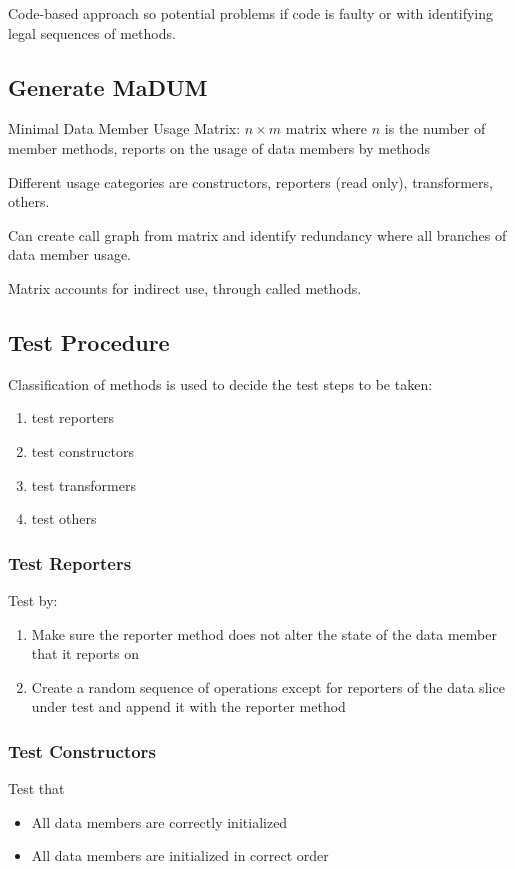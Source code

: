 \documentclass[11pt]{article}
\begin{document}
Code-based approach so potential problems if code is faulty
or with identifying legal sequences of methods.
\subsection{Generate MaDUM}
\label{sec:orgcc06cb6}
Minimal Data Member Usage Matrix: \(n \times m\) matrix where \(n\) is
the number of member methods, reports on the usage of data
members by methods

Different usage categories are constructors, reporters (read only),
transformers, others.

Can create call graph from matrix and identify redundancy where all
branches of data member usage.

Matrix accounts for indirect use, through called methods.
\subsection{Test Procedure}
\label{sec:orgda9ab09}
Classification of methods is used to decide the test steps to
be taken:
\begin{enumerate}
\item test reporters
\item test constructors
\item test transformers
\item test others
\end{enumerate}
\subsubsection{Test Reporters}
\label{sec:orge64fc62}
Test by:
\begin{enumerate}
\item Make sure the reporter method does not alter the state of the
data member that it reports on
\item Create a random sequence of operations except for reporters
of the data slice under test and append it with the
reporter method
\end{enumerate}
\subsubsection{Test Constructors}
\label{sec:org603293c}
Test that
\begin{itemize}
\item All data members are correctly initialized
\item All data members are initialized in correct order
\end{itemize}
\end{document}
